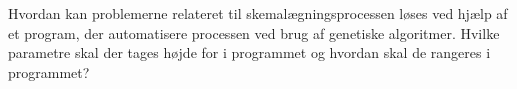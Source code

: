 Hvordan kan problemerne relateret til skemalægningsprocessen løses ved hjælp af et program, der automatisere processen ved brug af genetiske algoritmer. Hvilke parametre skal der tages højde for i programmet og hvordan skal de rangeres i programmet?